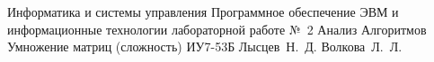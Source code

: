 \documentclass{bmstu}
\begin{document}
	
\makereporttitle
{Информатика и системы управления} %
{Программное обеспечение ЭВМ и информационные технологии}
{лабораторной работе №~2} %
{Анализ Алгоритмов} %
{Умножение матриц (сложность)} %
{} %
{ИУ7-53Б} %
{Лысцев~Н.~Д.} %
{Волкова~Л.~Л.}

\maketableofcontents








\makebibliography
\end{document}

